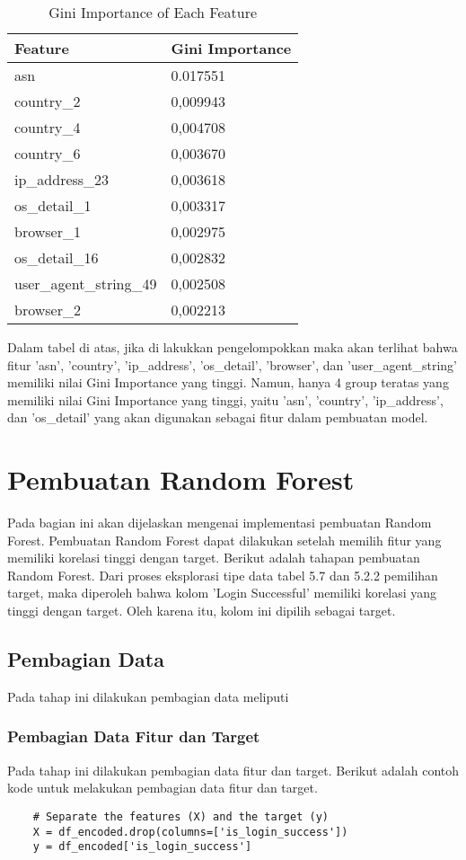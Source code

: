     \begin{table}[H]
    \centering
    \begin{tabular}{|l|l|}
    \hline
    \textbf{Feature} & \textbf{Gini Importance} \\ \hline
    asn & 0.017551 \\ 
    country\_2 & 0,009943 \\ 
    country\_4 & 0,004708 \\ 
    country\_6 & 0,003670 \\ 
    ip\_address\_23 & 0,003618 \\ 
    os\_detail\_1 & 0,003317 \\ 
    browser\_1 & 0,002975 \\ 
    os\_detail\_16 & 0,002832 \\ 
    user\_agent\_string\_49 & 0,002508 \\ 
    browser\_2 & 0,002213 \\ \hline
    \end{tabular}
    \caption{Gini Importance of Each Feature}
    \label{tab:gini_importance}
    \end{table}

    Dalam tabel di atas, jika di lakukkan pengelompokkan maka akan terlihat bahwa fitur 'asn', 'country', 'ip\_address', 'os\_detail', 'browser', dan 'user\_agent\_string' memiliki nilai Gini Importance yang tinggi. 
    Namun, hanya 4 group teratas yang memiliki nilai Gini Importance yang tinggi, yaitu 'asn', 'country', 'ip\_address', dan 'os\_detail' yang akan digunakan sebagai fitur dalam pembuatan model.

\section{Pembuatan Random Forest}
Pada bagian ini akan dijelaskan mengenai implementasi pembuatan Random Forest. Pembuatan Random Forest dapat dilakukan setelah memilih fitur yang memiliki korelasi tinggi dengan target. Berikut adalah tahapan pembuatan Random Forest.
Dari proses eksplorasi tipe data tabel 5.7 dan 5.2.2 pemilihan target, maka diperoleh bahwa kolom 'Login Successful' memiliki korelasi yang tinggi dengan target. Oleh karena itu, kolom ini dipilih sebagai target.
\subsection{Pembagian Data}
Pada tahap ini dilakukan pembagian data meliputi

\subsubsection{Pembagian Data Fitur dan Target}
Pada tahap ini dilakukan pembagian data fitur dan target. Berikut adalah contoh kode untuk melakukan pembagian data fitur dan target.
\begin{lstlisting}
    # Separate the features (X) and the target (y)
    X = df_encoded.drop(columns=['is_login_success'])
    y = df_encoded['is_login_success']
    \end{lstlisting}

